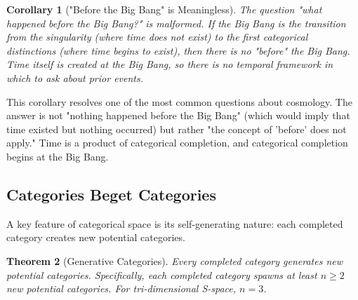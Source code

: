 \documentclass[12pt,a4paper]{article}
\newtheorem{theorem}{Theorem}[section]
\newtheorem{corollary}[theorem]{Corollary}
\theoremstyle{definition}
\theoremstyle{remark}
\begin{document}
\begin{corollary}["Before the Big Bang" is Meaningless]
\label{cor:before_big_bang}
The question "what happened before the Big Bang?" is malformed. If the Big Bang is the transition from the singularity (where time does not exist) to the first categorical distinctions (where time begins to exist), then there is no "before" the Big Bang. Time itself is created at the Big Bang, so there is no temporal framework in which to ask about prior events.
\end{corollary}

This corollary resolves one of the most common questions about cosmology. The answer is not "nothing happened before the Big Bang" (which would imply that time existed but nothing occurred) but rather "the concept of 'before' does not apply." Time is a product of categorical completion, and categorical completion begins at the Big Bang.

\subsection{Categories Beget Categories}

A key feature of categorical space is its self-generating nature: each completed category creates new potential categories.

\begin{theorem}[Generative Categories]
\label{thm:generative}
Every completed category generates new potential categories. Specifically, each completed category spawns at least $n \geq 2$ new potential categories. For tri-dimensional S-space, $n = 3$.
\end{theorem}
\end{document}
